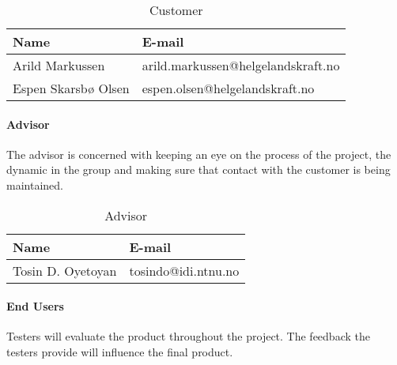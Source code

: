 \begin{table}

\begin{center}
    \begin{tabular}{| l | l |}
   	\hline
    {\bf Name} & {\bf E-mail} \\ \hline \hline
    Arild Markussen & arild.markussen@helgelandskraft.no \\ \hline
    Espen Skarsbø Olsen & espen.olsen@helgelandskraft.no \\
    \hline
    \end{tabular}
\end{center}

\caption{Customer}
\end{table}

\paragraph{Advisor}

The advisor is concerned with keeping an eye on the process of the project, the dynamic in the group and making sure that contact with the customer is being maintained. 

\begin{table}

\begin{center}
    \begin{tabular}{| l | l |}
    \hline
    {\bf Name} & {\bf E-mail} \\ \hline \hline
    Tosin D. Oyetoyan & tosindo@idi.ntnu.no \\ \hline
    \hline
    \end{tabular}
\end{center}

\caption{Advisor}
\end{table}

\paragraph{End Users}

Testers will evaluate the product throughout the project. The feedback the testers provide will influence the final product.